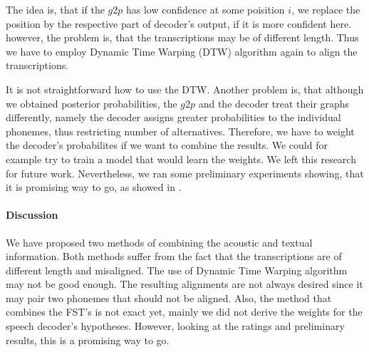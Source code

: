 \par
The idea is, that if the $g2p$ has low confidence at some poisition $i$, we replace the position by the respective part of decoder's output, if it is more confident here.
however, the problem is, that the transcriptions may be of different length.
Thus we have to employ Dynamic Time Warping (DTW) algorithm again to align the transcriptions.
\par
It is not straightforward how to use the DTW.
Another problem is, that although we obtained posterior probabilities, the $g2p$ and the decoder treat their graphs differently, namely the decoder assigns greater probabilities to the individual phonemes, thus restricting number of alternatives.
Therefore, we have to weight the decoder's probabilites if we want to combine the results.
We could for example try to train a model that would learn the weights.
We left this research for future work.
Nevertheless, we ran some preliminary experiments showing, that it is promising way to go, as showed in .
\paragraph{Discussion}
We have proposed two methods of combining the acoustic and textual information.
Both methods suffer from the fact that the transcriptions are of different length and misaligned.
The use of Dynamic Time Warping algorithm may not be good enough.
The resulting alignments are not always desired since it may pair two phonemes that should not be aligned.
Also, the method that combines the FST's is not exact yet, mainly we did not derive the weights for the speech decoder's hypotheses.
However, looking at the ratings and preliminary results, this is a promising way to go.